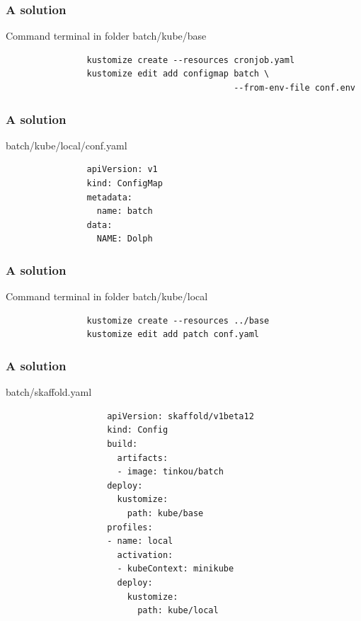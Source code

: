 	\begin{frame}[fragile]
		\frametitle{A solution}

		\begin{block}{Command terminal in folder batch/kube/base}
			\begin{verbatim}
				kustomize create --resources cronjob.yaml
				kustomize edit add configmap batch \
				                             --from-env-file conf.env
			\end{verbatim}
		\end{block}
	\end{frame}
	
	\begin{frame}[fragile]
		\frametitle{A solution}
		
		\begin{block}{batch/kube/local/conf.yaml}
			\begin{verbatim}
				apiVersion: v1
				kind: ConfigMap
				metadata:
				  name: batch
				data:
				  NAME: Dolph
			\end{verbatim}
		\end{block}
	\end{frame}
	
	\begin{frame}[fragile]
		\frametitle{A solution}
		
		\begin{block}{Command terminal in folder batch/kube/local}
			\begin{verbatim}
				kustomize create --resources ../base
				kustomize edit add patch conf.yaml
			\end{verbatim}
		\end{block}
	\end{frame}
	
	\begin{frame}[fragile]
		\frametitle{A solution}
		
		\begin{block}{batch/skaffold.yaml}
			\begin{footnotesize}
				\begin{verbatim}
					apiVersion: skaffold/v1beta12
					kind: Config
					build:
					  artifacts:
					  - image: tinkou/batch
					deploy:
					  kustomize:
					    path: kube/base
					profiles:
					- name: local
					  activation:
					  - kubeContext: minikube
					  deploy:
					    kustomize:
					      path: kube/local
				\end{verbatim}
			\end{footnotesize}
		\end{block}
	\end{frame}
	
